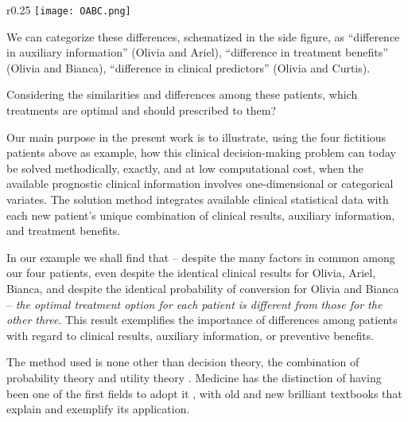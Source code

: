 \documentclass[utf8]{FrontiersinHarvard} %
\newcommand*{\pencil}{{\fontencoding{U}\fontfamily{fontawesometwo}\selectfont\symbol{210}}}
\newcommand{\mynotep}[1]{{\color{notecolour}\pencil\ #1}}
\newcommand*{\chaps}{chs}%
\renewcommand*{\|}[1][]{\nonscript\:#1\vert\nonscript\:\mathopen{}}
\begin{document}
\begin{wrapfigure}{r}{0.25\linewidth}%
\vspace{-2em}\texttt{[image: OABC.png]}
\end{wrapfigure}%
We can categorize these differences, schematized in the side figure, as \enquote{difference in auxiliary information} (Olivia and Ariel), \enquote{difference in treatment benefits} (Olivia and Bianca), \enquote{difference in clinical predictors} (Olivia and Curtis).

Considering the similarities and differences among these patients, which treatments are optimal and should prescribed to them?

\medskip

Our main purpose in the present work is to illustrate, using the four fictitious patients above as example, how this clinical decision-making problem can today be solved methodically, exactly, and at low computational cost, when the available prognostic clinical information involves one-dimensional or categorical variates. The solution method integrates available clinical statistical data with each new patient's unique combination of clinical results, auxiliary information, and treatment benefits. %

In our example we shall find that -- despite the many factors in common among our four patients, even despite the identical clinical results for Olivia, Ariel, Bianca, and despite the identical probability of conversion for Olivia and Bianca -- \emph{the optimal treatment option for each patient is different from those for the other three}. This result exemplifies the importance of differences among patients with regard to clinical results, auxiliary information, or preventive benefits.

The method used is none other than decision theory, the combination of probability theory and utility theory \citep[\chaps~13--14]{vonneumannetal1944_r1955,raiffaetal1961_r2000,raiffa1968_r1970,lindley1971_r1988,kreps1988,jaynes1994_r2003}. Medicine has the distinction of having been one of the first fields to adopt it \citep{ledleyetal1959}, with old and new brilliant textbooks \citep{weinsteinetal1980,soxetal1988_r2013,huninketal2001_r2014} that explain and exemplify its application.
\end{document}
